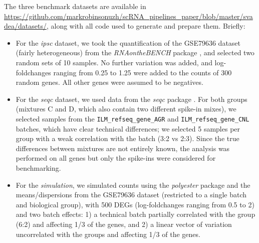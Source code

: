 \documentclass{bmcart}
\begin{document}
The three benchmark datasets are available in \url{https://github.com/markrobinsonuzh/scRNA\_pipelines\_paper/blob/master/svadea/datasets/}, along with all code used to generate and prepare them. Briefly:
\begin{itemize}
    \item For the \textit{ipsc} dataset, we took the quantification of the GSE79636 dataset (fairly heterogeneous) from the \textit{RNAontheBENCH} package \citep{germainRNAontheBENCHComputationalEmpirical2016}, and selected two random sets of 10 samples. No further variation was added, and log-foldchanges ranging from 0.25 to 1.25 were added to the counts of 300 random genes. All other genes were assumed to be negatives.
    \item For the \textit{seqc} dataset, we used data from the \textit{seqc} package \citep{ComprehensiveAssessment2014}. For both groups (mixtures C and D, which also contain two different spike-in mixes), we selected samples from the \texttt{ILM\_refseq\_gene\_AGR} and \texttt{ILM\_refseq\_gene\_CNL} batches, which have clear technical differences; we selected 5 samples per group with a weak correlation with the batch (3:2 vs 2:3). Since the true differences between mixtures are not entirely known, the analysis was performed on all genes but only the spike-ins were considered for benchmarking.
    \item For the \textit{simulation}, we simulated counts using the \textit{polyester} package \citep{frazeePolyesterSimulating2015} and the means/dispersions from the GSE79636 dataset (restricted to a single batch and biological group), with 500 DEGs (log-foldchanges ranging from 0.5 to 2) and two batch effects: 1) a technical batch partially correlated with the group (6:2) and affecting 1/3 of the genes, and 2) a linear vector of variation uncorrelated with the groups and affecting 1/3 of the genes.
\end{itemize}



\end{document}
